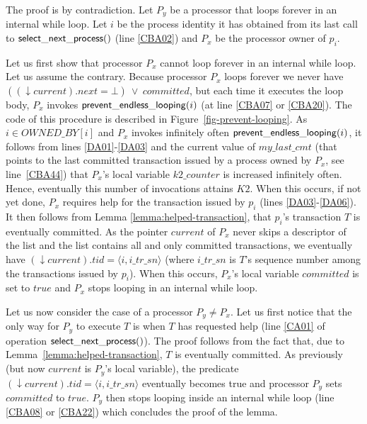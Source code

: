 \begin{proofL} 
The proof is by contradiction.
Let $P_y$ be a processor that loops  forever in an internal while loop. 
Let $i$ be the process identity it has obtained from its last call to 
${\sf select\_next\_process}()$ (line  \ref{CBA02}) and $P_x$  be
the processor owner of $p_i$. 

Let us first show that  processor $P_x$ cannot loop forever in an internal
 while loop. Let us assume the contrary. 
Because processor $P_x$ loops forever we never have $((\downarrow current).next=\bot)~\vee~
\mathit{committed}$, but each time it executes the loop body, 
$P_x$ invokes ${\sf prevent\_endless\_looping}(i)$ (at line \ref{CBA07} 
or \ref{CBA20}). The code of this procedure is described in 
Figure~\ref{fig-prevent-looping}.  
As $i \in \mathit{OWNED\_BY}[i]$ and $P_x$ invokes infinitely often 
${\sf prevent\_endless\_looping}(i)$, it follows from lines 
\ref{DA01}-\ref{DA03}  and the current value of  $my\_last\_cmt$ (that 
points  to the last committed transaction issued by a process owned by 
$P_x$, see line~\ref{CBA44}) that 
$P_x$'s local variable $k2\_counter$ is increased infinitely often.
Hence, eventually this number of invocations attains $K2$. 
When this  occurs, if not yet done, $P_x$ requires help  for the 
transaction issued by $p_i$ (lines \ref{DA03}-\ref{DA06}). 
It then follows from  Lemma \ref{lemma:helped-transaction},  
that $p_i$'s  transaction $T$  is  eventually  committed. As the  pointer
$current$ of $P_x$ never skips a descriptor of the list
and the list contains all and only committed transactions, 
we eventually have $(\downarrow current).tid = \langle i,i\_tr\_sn \rangle$
(where $i\_tr\_sn$  is $T$'s sequence number among the transactions issued
by $p_i$). When this occurs,  $P_x$'s local variable  $\mathit{committed}$ 
is set to $\mathit{true}$ and $P_x$ stops looping in an internal while loop. 


Let us now consider the case of a processor  $P_y \neq P_x$. 
Let us first notice that the only way for $P_y$ to execute $T$ is when 
$T$   has   requested   help    (line   \ref{CA01}   of   operation   ${\sf
select\_next\_process}()$). 
The proof follows from the fact that, due to
 Lemma~\ref{lemma:helped-transaction}, $T$ is eventually committed. 
As previously (but now  $current$ is  $P_y$'s local variable),
the predicate  $(\downarrow current).tid = \langle i,i\_tr\_sn \rangle$ 
eventually becomes true and processor $P_y$ sets  $\mathit{committed}$ 
 to $\mathit{true}$. $P_y$ then stops looping inside an internal while 
loop (line \ref{CBA08} or \ref{CBA22})  which concludes the proof of the lemma.
\renewcommand{\toto}{lemma:no-infinite-loop}
\end{proofL}

